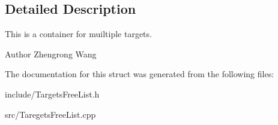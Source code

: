 \subsection{Detailed Description}
This is a container for muiltiple targets.

\begin{DoxyAuthor}{Author}
Zhengrong Wang 
\end{DoxyAuthor}


The documentation for this struct was generated from the following files\+:\begin{DoxyCompactItemize}
\item 
include/Targets\+Free\+List.\+h\item 
src/Taregets\+Free\+List.\+cpp\end{DoxyCompactItemize}
